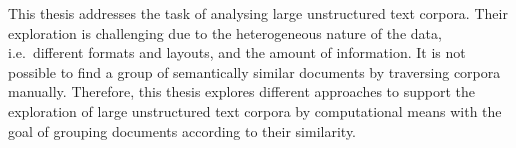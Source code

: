 This thesis addresses the task of analysing large unstructured text corpora.
Their exploration is challenging due to the heterogeneous nature of the data, 
i.e.\ different formats and layouts, and the amount of information.
It is not possible to find a group of semantically similar documents by traversing corpora manually.
Therefore, this thesis explores different approaches to support the exploration of large unstructured text corpora 
by computational means with the goal of grouping documents according to their similarity.